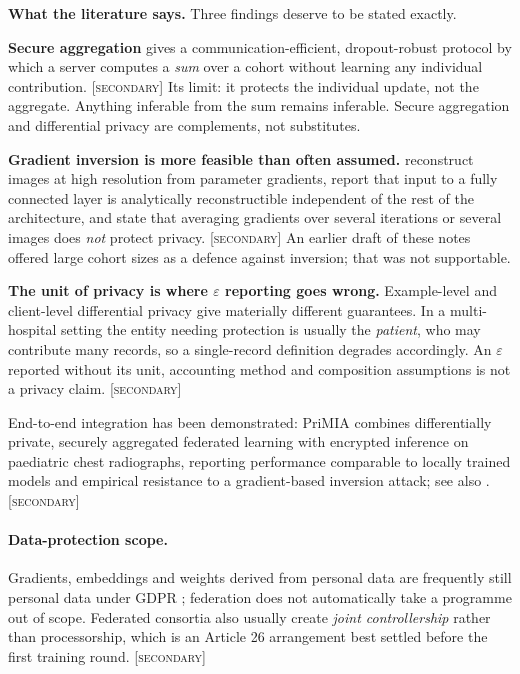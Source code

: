 \documentclass[11pt,a4paper]{article}
\newcommand{\secondary}{\textsc{[secondary]}}
\newcommand{\evidence}[1]{\par\smallskip\noindent\textbf{What the literature says.} #1}
\begin{document}
\evidence{Three findings deserve to be stated exactly.

\textbf{Secure aggregation} \citep{bonawitz2017practical} gives a
communication-efficient, dropout-robust protocol by which a server computes
a \emph{sum} over a cohort without learning any individual contribution.
\secondary{} Its limit: it protects the individual update, not the
aggregate. Anything inferable from the sum remains inferable. Secure
aggregation and differential privacy are complements, not substitutes.

\textbf{Gradient inversion is more feasible than often assumed.}
\citet{geiping2020inverting} reconstruct images at high resolution from
parameter gradients, report that input to a fully connected layer is
analytically reconstructible independent of the rest of the architecture,
and state that averaging gradients over several iterations or several images
does \emph{not} protect privacy. \secondary{} An earlier draft of these
notes offered large cohort sizes as a defence against inversion; that was
not supportable.

\textbf{The unit of privacy is where $\varepsilon$ reporting goes wrong.}
Example-level and client-level differential privacy give materially
different guarantees. In a multi-hospital setting the entity needing
protection is usually the \emph{patient}, who may contribute many records,
so a single-record definition degrades accordingly. An $\varepsilon$
reported without its unit, accounting method and composition assumptions is
not a privacy claim. \secondary

End-to-end integration has been demonstrated: PriMIA
\citep{kaissis2021endtoend} combines differentially private, securely
aggregated federated learning with encrypted inference on paediatric chest
radiographs, reporting performance comparable to locally trained models and
empirical resistance to a gradient-based inversion attack; see also
\citet{kaissis2020secure}. \secondary}

\paragraph{Data-protection scope.} Gradients, embeddings and weights derived
from personal data are frequently still personal data under GDPR
\citep{gdpr, edpb28_2024}; federation does not automatically take a
programme out of scope. Federated consortia also usually create
\emph{joint controllership} rather than processorship, which is an Article 26
arrangement best settled before the first training round. \secondary
\end{document}
